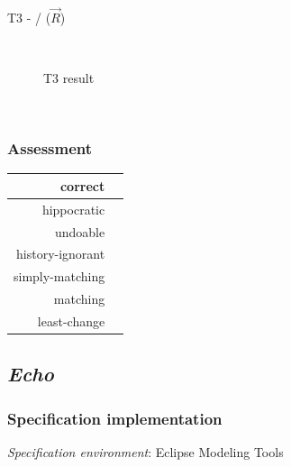 \documentclass{article}
\newcommand{\cmark}{\ding{51}}%
\begin{document}
~\\

T3 -  /  ($\overrightarrow{R}$)
\begin{figure}[ht]
    \centering
    \mbox{\quad\qquad\quad
          }
    \caption{T3 result}
    \label{fig:T3}
\end{figure}

~\\

\subsubsection{Assessment}



\begin{center}
\begin{tabular}{| r | c | }
  \hline                        
  correct & \cmark \\
  \hline
  hippocratic &  \\
  \hline 
  undoable &  \\
  \hline 
  history-ignorant &  \\
  \hline 
  simply-matching &  \\
  \hline 
  matching &  \\
  \hline 
  least-change &  \\
  \hline   
\end{tabular}
\end{center}


\pagebreak
\subsection{\textit{Echo}}
\subsubsection{Specification implementation}
\textit{Specification environment}: Eclipse Modeling Tools
~\\
\end{document}
